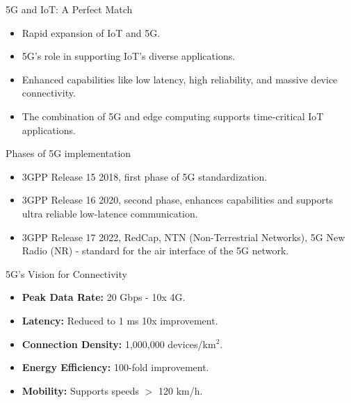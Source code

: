 \documentclass{beamer}
\begin{document}
\begin{frame}{5G and IoT: A Perfect Match}
  \begin{itemize}
      \item Rapid expansion of IoT and 5G.
      \vspace*{0.7em}
      \item 5G's role in supporting IoT's diverse applications.
      \vspace*{0.7em}
      \item Enhanced capabilities like low latency, high reliability, and massive device connectivity.
      \vspace*{0.7em}
      \item The combination of 5G and edge computing supports time-critical IoT applications.
  \end{itemize}
\end{frame}

\begin{frame}{Phases of 5G implementation}
  \begin{itemize}
      \item 3GPP Release 15 2018, first phase of 5G standardization.
      \vspace*{0.5em}
      \item 3GPP Release 16 2020, second phase, enhances capabilities and supports ultra reliable low-latence communication.
      \vspace*{0.5em}
      \item 3GPP Release 17 2022, RedCap, NTN (Non-Terrestrial Networks), 5G New Radio (NR) - standard for the air interface of the 5G network.
  \end{itemize}
\end{frame}

\begin{frame}{5G's Vision for Connectivity}
  \begin{itemize}
      \item \textbf{Peak Data Rate:} 20 Gbps - 10x 4G.
      \vspace*{0.4em}
      \item \textbf{Latency:} Reduced to 1 ms 10x improvement.
      \vspace*{0.4em}
      \item \textbf{Connection Density:} 1,000,000 devices/km$^2$.
      \vspace*{0.4em}
      \item \textbf{Energy Efficiency:} 100-fold improvement.
      \vspace*{0.4em}
      \item \textbf{Mobility:} Supports speeds $>$ 120 km/h.
  \end{itemize}
\end{frame}
\end{document}
